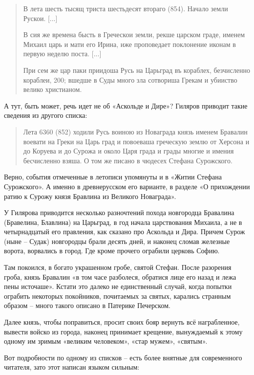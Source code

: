 \begin{quotation}  
В лета шесть тысящ триста шестьдесят втораго (854). Начало земли Рускои. [...]

В сия же времена бысть в Греческои земли, рекше царском граде, именем Михаил царь и мати его Ирина, иже проповедает поклонение иконам в первую неделю поста. [...]

При сем же цар паки приидоша Русь на Царьград въ кораблех, безчисленно кораблеи, 200; вшедше в Суды много зла сотвориша Грекам и убииство велико христианом.
\end{quotation}  

А тут, быть может, речь идет не об «Аскольде и Дире»? Гиляров приводит \cite[стр. 102]{gilyarov01} такие сведения из другого списка:

\begin{quotation}
Лета 6360 (852) ходили Русь воиною из Новаграда князь именем Бравалин воевати на Греки на Царь град и повоеваша греческую землю от Херсона и до Коруева и до Сурожа и около Царя града и грады многие и имения бесчисленно взяша. О том же писано в чюдесех Стефана Сурожского.
\end{quotation}

Верно, события отмеченные в летописи упомянуты и в «Житии Стефана Сурожского». А именно в древнерусском его варианте, в разделе «О прихождении ратию к Сурожу князя Бравлина из Великого Новаграда».

У Гилярова приводится несколько разночтений похода новгородца Бравалина (Бравелина, Блавлина) на Царьград, в год начала царствования Михаила, а не в четырнадцатый его правления, как сказано про Аскольда и Дира. Причем Сурож (ныне – Судак) новгородцы брали десять дней, и наконец сломав железные ворота, ворвались в город. Где кроме прочего ограбили церковь Софию. 

Там покоился, в богато украшенном гробе, святой Стефан. После разорения гроба, князь Бравалин «в том часе разболеся, обратися лице его назад и лежа пены источаше». Кстати это далеко не единственный случай, когда попытки ограбить некоторых покойников, почитаемых за святых, карались странным образом – много такого описано в Патерике Печерском. 

Далее князь, чтобы поправиться, просит своих бояр вернуть всё награбленное, вывести войско из города, наконец принимает крещение, вынуждаемый к этому одному им зримым «великим человеком», «стар мужем», «святым». 

Вот подробности по одному из списков – есть более внятные для современного читателя, зато этот написан языком сильным:

